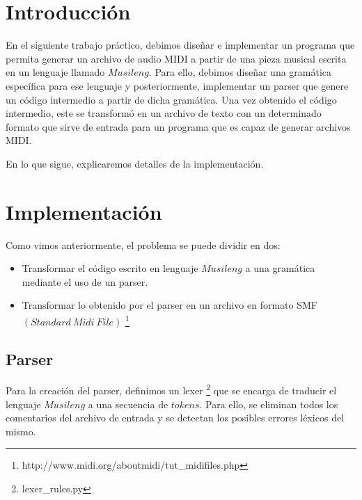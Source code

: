 \documentclass[a4paper, 10pt, twoside]{article}
\begin{document}
\newpage

\tableofcontents

\newpage



\section{Introducción}

En el siguiente trabajo práctico, debimos diseñar e implementar un programa que permita generar un archivo de audio MIDI a partir de una pieza musical escrita en un lenguaje llamado $Musileng$. Para ello, debimos diseñar una gramática específica para ese lenguaje y posteriormente, implementar un parser que genere un código intermedio a partir de dicha gramática. Una vez obtenido el código intermedio, este se transformó en un archivo de texto con un determinado formato que sirve de entrada para un programa que es capaz de generar archivos MIDI.

En lo que sigue, explicaremos detalles de la implementación.
\newpage


\section{Implementación}
Como vimos anteriormente, el problema se puede dividir en dos:
\begin{itemize}
 \item Transformar el código escrito en lenguaje $Musileng$ a una gramática mediante el uso de un parser.

 \item Transformar lo obtenido por el parser en un archivo en formato SMF $(Standard\ Midi\ File)$ \footnote{http://www.midi.org/aboutmidi/tut\_midifiles.php}

\end{itemize}

\subsection{Parser}
Para la creación del parser, definimos un lexer \footnote{lexer\_rules.py} que se encarga de traducir el lenguaje $Musileng$ a una secuencia de $tokens$. Para ello, se eliminan todos los comentarios del archivo de entrada y se detectan los posibles errores léxicos del mismo.
\end{document}
